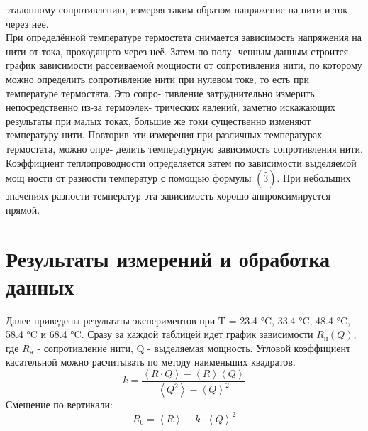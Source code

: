 \documentclass[a4paper, 10pt, twocolumn]{article}
\begin{document}
    эталонному сопротивлению, измеряя таким образом напряжение на нити и ток через неё.
    \\ \newline
    При определённой температуре термостата снимается зависимость напряжения на нити от тока, 
    проходящего через неё. Затем по полу- ченным данным строится график зависимости рассеиваемой 
    мощности от сопротивления нити, по которому можно определить сопротивление нити при нулевом токе,
     то есть при температуре термостата. Это сопро- тивление затруднительно измерить непосредственно
     из-за термоэлек- трических явлений, заметно искажающих результаты при малых токах, большие же 
    токи существенно изменяют температуру нити. Повторив эти измерения при различных температурах 
    термостата, можно опре- делить температурную зависимость сопротивления нити. Коэффициент 
    теплопроводности определяется затем по зависимости выделяемой мощ ности от разности температур с
     помощью формулы $(\widehat{3})$. При небольших значениях разности температур эта зависимость хорошо 
    аппроксимируется прямой.
\section{Результаты измерений и обработка данных}
    Далее приведены результаты экспериментов при T = 23.4 °C, 33.4 °C, 48.4 °C, 58.4 °C и 68.4 °C.
    Сразу за каждой таблицей идет график зависимости $R_\text{н}(Q)$, где $R_\text{н}$ - сопротивление нити, 
    Q - выделяемая  мощность. \newline
    Угловой коэффициент касательной можно расчитывать по методу наименьших квадратов.
    $$k = \frac{\left\langle R \cdot Q \right\rangle - \left\langle R \right\rangle \left\langle Q \right\rangle}
    {\left\langle Q^2 \right\rangle - \left\langle Q \right\rangle^2}$$
    Смещение по вертикали: $$R_0 = \left\langle R \right\rangle - k \cdot \left\langle Q \right\rangle^2$$
\end{document}
